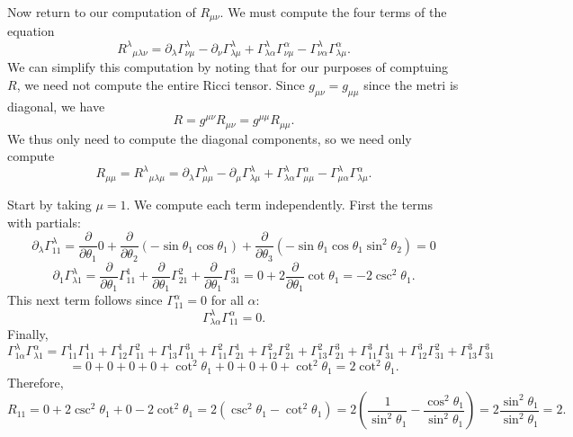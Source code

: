 \documentclass[11pt, letterpaper]{article}
\begin{document}
Now return to our computation of $R_{\mu \nu } $. We must compute the four terms of the equation
\[
	R^\lambda \!_{\mu \lambda \nu } = \partial _\lambda \Gamma ^\lambda _{\nu \mu } -\partial _\nu \Gamma ^\lambda _{\lambda \mu } +\Gamma ^\lambda _{\lambda \alpha } \Gamma ^\alpha _{\nu \mu } - \Gamma ^\lambda _{\nu \alpha } \Gamma ^\alpha _{\lambda \mu } 
.\]
We can simplify this computation by noting that for our purposes of comptuing $R$, we need not compute the entire Ricci tensor. Since $g_{\mu \nu } =g_{\mu \mu }$ since the metri is diagonal, we have
\[
	R = g^{\mu \nu } R_{\mu \nu } =g^{\mu \mu } R_{\mu \mu } 
.\]
We thus only need to compute the diagonal components, so we need only compute
\[
	R_{\mu \mu } =R^\lambda\!_{\mu \lambda \mu } =\partial _\lambda \Gamma ^\lambda _{\mu \mu } -\partial _\mu \Gamma ^\lambda _{\lambda \mu } +\Gamma ^\lambda _{\lambda \alpha } \Gamma ^\alpha _{\mu \mu } -\Gamma ^\lambda _{\mu \alpha } \Gamma ^\alpha _{\lambda \mu } 
.\]

Start by taking $\mu =1$. We compute each term independently. First the terms with partials:
\[
	\partial _\lambda  \Gamma ^\lambda_{11} =\frac{\partial }{\partial \theta _1} 0 + \frac{\partial }{\partial \theta _2} (-\sin \theta _1 \cos \theta _1) + \frac{\partial }{\partial \theta _3} \left( - \sin \theta _1 \cos \theta _1 \sin ^2\theta _2 \right)  = 0
\]
\[
	\partial_1 \Gamma ^\lambda_{\lambda 1} =\frac{\partial }{\partial \theta _1} \Gamma ^1_{11} + \frac{\partial }{\partial \theta _1} \Gamma ^2_{21} + \frac{\partial }{\partial \theta _1} \Gamma ^3_{31} = 0 + 2\frac{\partial }{\partial \theta _1} \cot \theta _1 = -2\csc ^2 \theta _1
.\]
This next term follows since $\Gamma^\alpha  _{11} =0$ for all $\alpha $:
\[
	\Gamma ^\lambda _{\lambda \alpha } \Gamma ^\alpha _{11} =0.
\]
Finally,
\[
	\Gamma ^\lambda _{1\alpha } \Gamma ^\alpha _{\lambda 1} =\Gamma^1_{11} \Gamma ^1_{11} + \Gamma ^1_{12} \Gamma ^2_{11} + \Gamma ^1_{13} \Gamma ^3_{11} + \Gamma ^2_{11} \Gamma ^1_{21} +\Gamma ^2_{12} \Gamma ^2_{21} +\Gamma ^2_{13} \Gamma ^3_{21} +\Gamma ^3_{11} \Gamma ^1_{31} +\Gamma ^3_{12} \Gamma ^2_{31} +\Gamma ^3_{13} \Gamma ^3_{31} 
\]
\[
	=0+0+0+0+\cot ^2\theta _1+0+0+0+\cot ^2\theta _1 = 2 \cot ^2\theta _1
.\]
Therefore,
\[
	R_{11} = 0 + 2 \csc ^2\theta _1 + 0 - 2 \cot ^2 \theta _1 = 2\left( \csc ^2\theta _1 - \cot ^2 \theta _1 \right) =2\left( \frac{1}{\sin ^2\theta _1} -\frac{\cos ^2\theta _1}{\sin ^2\theta _1}  \right) =2\frac{\sin ^2\theta _1}{\sin ^2\theta _1} =2
.\]
\end{document}
